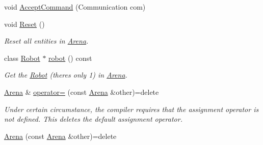 \begin{DoxyCompactItemize}
\item 
void \hyperlink{classArena_a16fac8e4b2399fcf0db01a9722069c33}{Accept\+Command} (Communication com)
\item 
void \hyperlink{classArena_a95e295d03a14385f4402a8e839fbae9b}{Reset} ()\hypertarget{classArena_a95e295d03a14385f4402a8e839fbae9b}{}\label{classArena_a95e295d03a14385f4402a8e839fbae9b}

\begin{DoxyCompactList}\small\item\em Reset all entities in \hyperlink{classArena}{Arena}. \end{DoxyCompactList}\item 
class \hyperlink{classRobot}{Robot} $\ast$ \hyperlink{classArena_af9b489317866a4541c6531acb63602c3}{robot} () const 
\begin{DoxyCompactList}\small\item\em Get the \hyperlink{classRobot}{Robot} (there\textquotesingle{}s only 1) in \hyperlink{classArena}{Arena}. \end{DoxyCompactList}\item 
\hyperlink{classArena}{Arena} \& \hyperlink{classArena_aa977a50aa4a5570a2a553705f1909e9b}{operator=} (const \hyperlink{classArena}{Arena} \&other)=delete\hypertarget{classArena_aa977a50aa4a5570a2a553705f1909e9b}{}\label{classArena_aa977a50aa4a5570a2a553705f1909e9b}

\begin{DoxyCompactList}\small\item\em Under certain circumstance, the compiler requires that the assignment operator is not defined. This {\ttfamily deletes} the default assignment operator. \end{DoxyCompactList}\item 
\hyperlink{classArena_afce6e35e1470823539dc9194bef77499}{Arena} (const \hyperlink{classArena}{Arena} \&other)=delete\hypertarget{classArena_afce6e35e1470823539dc9194bef77499}{}\label{classArena_afce6e35e1470823539dc9194bef77499}


\end{DoxyCompactItemize}
